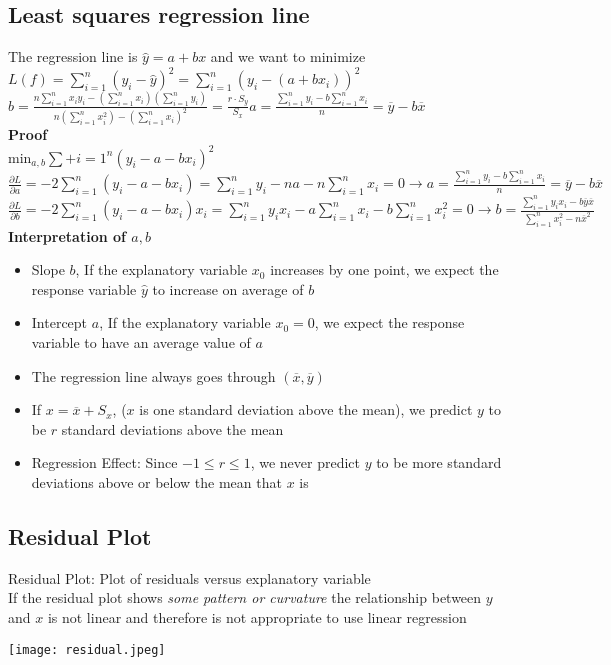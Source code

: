 \documentclass{article}
\begin{document}
\subsection{Least squares regression line}
The regression line is $\hat{y}=a+bx$ and we want to minimize $L(f)=\sum_{i=1}^n(y_i-\hat{y})^2=\sum_{i=1}^n(y_i-(a+bx_i))^2$\\
$b=\frac{n\sum_{i=1}^nx_iy_i-(\sum_{i=1}^nx_i)(\sum_{i=1}^ny_i)}{n(\sum_{i=1}^nx^2_i)-(\sum_{i=1}^nx_i)^2}=\frac{r\cdot S_y}{S_x}$\hspace*{0.5in}$a=\frac{\sum_{i=1}^ny_i-b\sum_{i=1}^nx_i}{n}=\overline{y}-b\overline{x}$\\
\textbf{Proof}\\
$\text{min}_{a,b}\sum+{i=1}^n(y_i-a-bx_i)^2$\\
$\frac{\partial L}{\partial a}=-2\sum_{i=1}^n(y_i-a-bx_i)=\sum_{i=1}^ny_i-na-n\sum_{i=1}^nx_i=0\rightarrow a=\frac{\sum_{i=1}^ny_i-b\sum_{i=1}^nx_i}{n}=\overline{y}-b\overline{x}$\\
$\frac{\partial L}{\partial b}=-2\sum_{i=1}^n(y_i-a-bx_i)x_i=\sum_{i=1}^ny_ix_i-a\sum_{i=1}^nx_i-b\sum_{i=1}^nx^2_i=0\rightarrow b=\frac{\sum_{i=1}^ny_ix_i-b\overline{y}\overline{x}}{\sum_{i=1}^nx_i^2-n\overline{x}^2}$\\
\textbf{Interpretation of $a,b$}
\begin{itemize}
    \item Slope $b$, If the explanatory variable $x_0$ increases by one point, we expect the response variable $\hat{y}$ to increase on average of $b$
    \item Intercept $a$, If the explanatory variable $x_0=0$, we expect the response variable to have an average value of $a$
    \item The regression line always goes through $(\overline{x},\overline{y})$
    \item If $x=\overline{x}+S_x$, ($x$ is one standard deviation above the mean), we predict $y$ to be $r$ standard deviations above the mean
    \item Regression Effect: Since $-1\leq r\leq 1$, we never predict $y$ to be more standard deviations above or below the mean that $x$ is
\end{itemize}
\subsection{Residual Plot}
Residual Plot: Plot of residuals versus explanatory variable\\
\newline
If the residual plot shows \textit{some pattern or curvature} the relationship between $y$ and $x$ is not linear and therefore is not appropriate to use linear regression
\begin{center}
\texttt{[image: residual.jpeg]}
\end{center}
\end{document}
